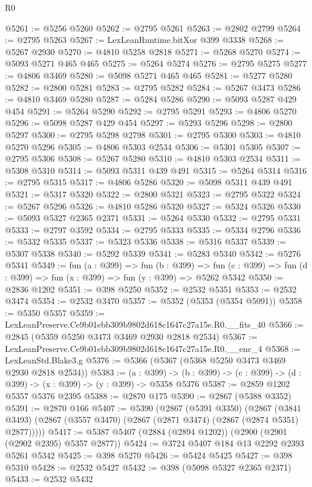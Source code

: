 \begin{lexlean}{R0}
\begin{coremodule}
@5261 := @5256 @5260
@5262 := @2795 @5261
@5263 := @2802 @2799
@5264 := @2795 @5263
@5267 := LexLeanRuntime.bitXor @399 @3338
@5268 := @5267 @2930
@5270 := @4810 @5258 @2818
@5271 := @5268 @5270
@5274 := @5093 @5271 @465 @465
@5275 := @5264 @5274
@5276 := @2795 @5275
@5277 := @4806 @3469
@5280 := @5098 @5271 @465 @465
@5281 := @5277 @5280
@5282 := @2800 @5281
@5283 := @2795 @5282
@5284 := @5267 @3473
@5286 := @4810 @3469 @5280
@5287 := @5284 @5286
@5290 := @5093 @5287 @429 @454
@5291 := @5264 @5290
@5292 := @2795 @5291
@5293 := @4806 @5270
@5296 := @5098 @5287 @429 @454
@5297 := @5293 @5296
@5298 := @2800 @5297
@5300 := @2795 @5298 @2798
@5301 := @2795 @5300
@5303 := @4810 @5270 @5296
@5305 := @4806 @5303 @2534
@5306 := @5301 @5305
@5307 := @2795 @5306
@5308 := @5267 @5280
@5310 := @4810 @5303 @2534
@5311 := @5308 @5310
@5314 := @5093 @5311 @439 @491
@5315 := @5264 @5314
@5316 := @2795 @5315
@5317 := @4806 @5286
@5320 := @5098 @5311 @439 @491
@5321 := @5317 @5320
@5322 := @2800 @5321
@5323 := @2795 @5322
@5324 := @5267 @5296
@5326 := @4810 @5286 @5320
@5327 := @5324 @5326
@5330 := @5093 @5327 @2365 @2371
@5331 := @5264 @5330
@5332 := @2795 @5331
@5333 := @2797 @3592
@5334 := @2795 @5333
@5335 := @5334 @2796
@5336 := @5332 @5335
@5337 := @5323 @5336
@5338 := @5316 @5337
@5339 := @5307 @5338
@5340 := @5292 @5339
@5341 := @5283 @5340
@5342 := @5276 @5341
@5349 := fun (a : @399) =>
  fun (b : @399) =>
  fun (c : @399) => fun (d : @399) => fun (x : @399) => fun (y : @399) => @5262 @5342
@5350 := @2836 @1202
@5351 := @398 @5250
@5352 := @2532 @5351
@5353 := @2532 @3474
@5354 := @2532 @3470
@5357 := @5352 (@5353 (@5354 @5091))
@5358 := @5350 @5357
@5359 := LexLeanPreserve.Ce9b01ebb309b9802d618c1647c27a15e.R0.__fits_40
@5366 := @2845 (@5359 @5250 @3473 @3469 @2930 @2818 @2534)
@5367 := LexLeanPreserve.Ce9b01ebb309b9802d618c1647c27a15e.R0.__enc_4
@5368 := LexLeanStd.Blake3.g
@5376 := @5366 (@5367 (@5368 @5250 @3473 @3469 @2930 @2818 @2534))
@5383 := (a : @399) ->
  (b : @399) -> (c : @399) -> (d : @399) -> (x : @399) -> (y : @399) -> @5358 @5376
@5387 := @2859 @1202 @5357 @5376 @2395
@5388 := @2870 @175
@5390 := @2867 (@5388 @3352)
@5391 := @2870 @166
@5407 := @5390
    (@2867
      (@5391 @3350)
      (@2867 (@3841 @3493) (@2867 (@3557 @3470) (@2867 (@2871 @3474) (@2867 (@2874 @5351) @2877)))))
@5417 := @5387 @5407 (@2884 (@2894 @1202)) (@2900 (@2901 (@2902 @2395) @5357 @2877))
@5424 := @3724 @5407 @184 @13 @2292 @2393 @5261 @5342
@5425 := @398 @5270
@5426 := @5424 @5425
@5427 := @398 @5310
@5428 := @2532 @5427
@5432 := @398 (@5098 @5327 @2365 @2371)
@5433 := @2532 @5432

\end{coremodule}
\end{lexlean}
